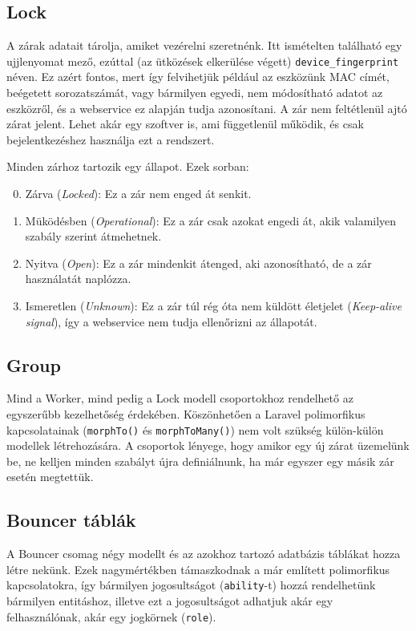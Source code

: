 \documentclass[a4paper,12pt]{thesis-ekf}
\theoremstyle{definition}
\begin{document}
			\subsection{Lock}
				A zárak adatait tárolja, amiket vezérelni szeretnénk. Itt ismételten található egy ujjlenyomat mező, ezúttal (az ütközések elkerülése végett) \texttt{device\_fingerprint} néven. Ez azért fontos, mert így felvihetjük például az eszközünk MAC címét, beégetett sorozatszámát, vagy bármilyen egyedi, nem módosítható adatot az eszközről, és a webservice ez alapján tudja azonosítani. A zár nem feltétlenül ajtó zárat jelent. Lehet akár egy szoftver is, ami függetlenül működik, és csak bejelentkezéshez használja ezt a rendszert.
				
				Minden zárhoz tartozik egy állapot. Ezek sorban:
				\begin{enumerate}
					\setcounter{enumi}{-1}
					\item Zárva (\emph{Locked}): Ez a zár nem enged át senkit.
					\item Müködésben (\emph{Operational}): Ez a zár csak azokat engedi át, akik valamilyen szabály szerint átmehetnek.
					\item Nyitva (\emph{Open}): Ez a zár mindenkit átenged, aki azonosítható, de a zár használatát naplózza.
					\item Ismeretlen (\emph{Unknown}): Ez a zár túl rég óta nem küldött életjelet (\emph{Keep-alive signal}), így a webservice nem tudja ellenőrizni az állapotát.
				\end{enumerate}
			
			\subsection{Group}
				Mind a Worker, mind pedig a Lock modell csoportokhoz rendelhető az egyszerűbb kezelhetőség érdekében. Köszönhetően a Laravel polimorfikus kapcsolatainak (\texttt{morphTo()} és \texttt{morphToMany()}) nem volt szükség külön-külön modellek létrehozására. A csoportok lényege, hogy amikor egy új zárat üzemelünk be, ne kelljen minden szabályt újra definiálnunk, ha már egyszer egy másik zár esetén megtettük.
				
			\subsection{Bouncer táblák}
				A Bouncer csomag négy modellt és az azokhoz tartozó adatbázis táblákat hozza létre nekünk. Ezek nagymértékben támaszkodnak a már említett polimorfikus kapcsolatokra, így bármilyen jogosultságot (\texttt{ability}-t) hozzá rendelhetünk bármilyen entitáshoz, illetve ezt a jogosultságot adhatjuk akár egy felhasználónak, akár egy jogkörnek (\texttt{role}).
			
\end{document}
